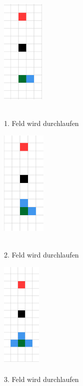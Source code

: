 {{		\begin{figure}[H]
			\begin{minipage}{0.5\textwidth}
				\centering
				\includegraphics[height=5cm]{Bilder/pathfinding_procedure_1.png}
				\caption{\\ 1. Feld wird durchlaufen} 
				\label{pic:pathfinding_procedure_1}
			\end{minipage}
			\begin{minipage}{0.5\textwidth}
				\centering
				\includegraphics[height=5cm]{Bilder/pathfinding_procedure_2.png}
				\caption{\\ 2. Feld wird durchlaufen} 
				\label{pic:pathfinding_procedure_2}
			\end{minipage}
		\newline
			\begin{minipage}{0.5\textwidth}
				\centering
				\includegraphics[height=5cm]{Bilder/pathfinding_procedure_3.png}
				\caption{\\ 3. Feld wird durchlaufen} 
				\label{pic:pathfinding_procedure_3}
			\end{minipage}

\end{figure}}}
